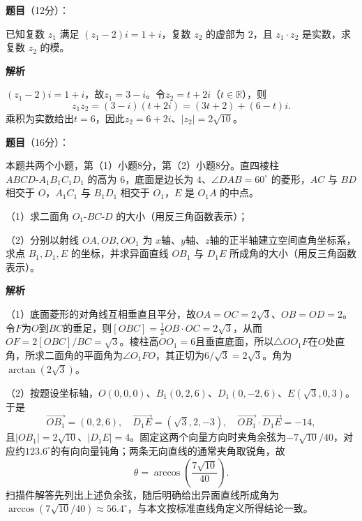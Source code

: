 \begin{answer}

\textbf{题目}（12分）：

已知复数 $z_1$ 满足 $(z_1-2)i=1+i$，复数 $z_2$ 的虚部为 $2$，且 $z_1\cdot z_2$ 是实数，求复数 $z_2$ 的模。

\textbf{解析}

$(z_1-2)i=1+i$，故$z_1=3-i$。令$z_2=t+2i$（$t\in\mathbb R$），则
\nopagebreak[4]
\[
z_1z_2=(3-i)(t+2i)=(3t+2)+(6-t)i.
\]
乘积为实数给出$t=6$，因此$z_2=6+2i$、$|z_2|=2\sqrt{10}$。


\end{answer}
\begin{answer}

\textbf{题目}（16分）：

本题共两个小题，第（1）小题8分，第（2）小题8分。直四棱柱 $ABCD\text{-}A_1B_1C_1D_1$ 的高为 $6$，底面是边长为 $4$、$\angle DAB=60^\circ$ 的菱形，$AC$ 与 $BD$ 相交于 $O$，$A_1C_1$ 与 $B_1D_1$ 相交于 $O_1$，$E$ 是 $O_1A$ 的中点。

（1）求二面角 $O_1\text{-}BC\text{-}D$ 的大小（用反三角函数表示）；

（2）分别以射线 $OA,OB,OO_1$ 为 $x$轴、$y$轴、$z$轴的正半轴建立空间直角坐标系，求点 $B_1,D_1,E$ 的坐标，并求异面直线 $OB_1$ 与 $D_1E$ 所成角的大小（用反三角函数表示）。
\nopagebreak[4]
\begin{center}\end{center}
\nopagebreak[4]
\textbf{解析}

（1）底面菱形的对角线互相垂直且平分，故$OA=OC=2\sqrt3$、$OB=OD=2$。令$F$为$O$到$BC$的垂足，则$[OBC]=\frac12 OB\cdot OC=2\sqrt3$，从而$OF=2[OBC]/BC=\sqrt3$。棱柱高$OO_1=6$且垂直底面，所以$\triangle OO_1F$在$O$处直角，所求二面角的平面角为$\angle O_1FO$，其正切为$6/\sqrt3=2\sqrt3$。角为$\arctan(2\sqrt3)$。

（2）按题设坐标轴，$O(0,0,0)$、$B_1(0,2,6)$、$D_1(0,-2,6)$、$E(\sqrt3,0,3)$。于是
\nopagebreak[4]
\[
\overrightarrow{OB_1}=(0,2,6),\quad\overrightarrow{D_1E}=(\sqrt3,2,-3),\quad
\overrightarrow{OB_1}\cdot\overrightarrow{D_1E}=-14,
\]
且$|OB_1|=2\sqrt{10}$、$|D_1E|=4$。固定这两个向量方向时夹角余弦为$-7\sqrt{10}/40$，对应约$123.6^\circ$的有向向量钝角；两条无向直线的通常夹角取锐角，故
\nopagebreak[4]
\[
\theta=\arccos\!\left(\frac{7\sqrt{10}}{40}\right).
\]
扫描件解答先列出上述负余弦，随后明确给出异面直线所成角为$\arccos(7\sqrt{10}/40)\approx56.4^\circ$，与本文按标准直线角定义所得结论一致。


\end{answer}
